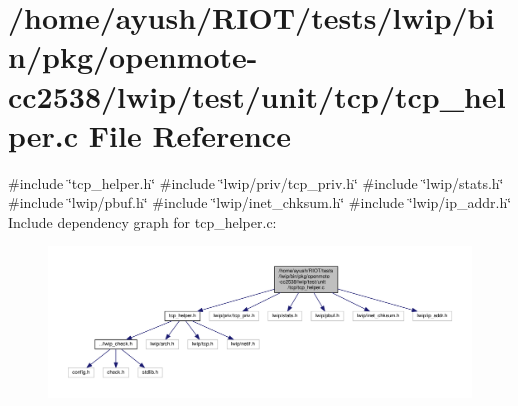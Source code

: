 \hypertarget{openmote-cc2538_2lwip_2test_2unit_2tcp_2tcp__helper_8c}{}\section{/home/ayush/\+R\+I\+O\+T/tests/lwip/bin/pkg/openmote-\/cc2538/lwip/test/unit/tcp/tcp\+\_\+helper.c File Reference}
\label{openmote-cc2538_2lwip_2test_2unit_2tcp_2tcp__helper_8c}
{\ttfamily \#include \char`\"{}tcp\+\_\+helper.\+h\char`\"{}}\newline
{\ttfamily \#include \char`\"{}lwip/priv/tcp\+\_\+priv.\+h\char`\"{}}\newline
{\ttfamily \#include \char`\"{}lwip/stats.\+h\char`\"{}}\newline
{\ttfamily \#include \char`\"{}lwip/pbuf.\+h\char`\"{}}\newline
{\ttfamily \#include \char`\"{}lwip/inet\+\_\+chksum.\+h\char`\"{}}\newline
{\ttfamily \#include \char`\"{}lwip/ip\+\_\+addr.\+h\char`\"{}}\newline
Include dependency graph for tcp\+\_\+helper.\+c\+:
\nopagebreak
\begin{figure}[H]
\begin{center}
\leavevmode
\includegraphics[width=350pt]{openmote-cc2538_2lwip_2test_2unit_2tcp_2tcp__helper_8c__incl}
\end{center}
\end{figure}
